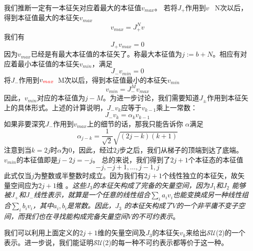 我们推断一定有一本征矢对应着最大的本征值{\sout{$v_{max}$}}。 若将$J_+$作用到$v$ \  N次以后，得到本征值最大的本征矢$v_{max}$
\begin{equation}\label{equ3.100}
  v_{max}=J_+^N v
\end{equation}
我们有
\begin{equation}\label{equ3.101}
  J_+v_{max}=0
\end{equation}
因为$v_{max}$已经是有最大本征值的本征矢了。称最大本征值为$j:=b+N$。相应有对应着最小本征值的本征矢$v_{min}$，满足
\begin{equation}\label{equ3.102}
  J_-v_{min}=0
\end{equation}
将$J_-$作用到$v_{\color{red}max}$\ M次以后，得到本征值最小的本征矢$v_{min}$
\begin{equation}\label{equ3.103}
  v_{min}=J_-^M v_{max}
\end{equation}
因此，$v_{min}$对应的本征值为$j-M$。为进一步讨论，我们需要知道$J_\pm$作用到本征矢上的具体形式。上述的计算说明，$J_- v_k$应等于$v_{k-1}$乘上一常数：
\begin{equation}\label{equ3.104}
  J_- v_k=\alpha_k v_{k-1}
\end{equation}
如果非要深究$J_-$作用到$v_{max}$上的细节的话，那我只能告诉你
 $\alpha$满足
\begin{equation}\label{equ3.105}
  \alpha_{j-k}=\frac{1}{\sqrt{2}}\sqrt{(2j-k)(k+1)}
\end{equation}
注意到当$k=2j$时$\alpha$为0，因此，经过$2j$步之后，我们从梯子的顶端到达了底端。$v_{min}$的本征值即是$j-2j=-j$。 总的来说，我们得到了$2j+1$个本征态的本征值
\begin{equation}\label{equ3.106}
  {-j,-j+1,\dots,j-1,j}
\end{equation}
此式仅当$j$为整数或半整数时成立。因为我们有$2j+1$个线性独立的本征矢，故矢量空间应为$2j+1$维
。{\it{这些$J_3$的本征矢构成了完备的矢量空间，因为$J_1$和$J_2$ 能够被$J_+$和$J_-$线性表示，就算是一个任意的线性组合$\sum_i a_i v_i$也能变换成另一种线性组合$\sum_i b_i v_i$，其中$a_i ,b_i$是常数。因此，$J_3$ 的本征矢构成了$V$的一个非平庸不变子空间，而我们也在寻找能构成完备矢量空间$V$的不可约表示}}。

我们可以利用上面定义的$2j+1$维的矢量空间及$J_3$的本征矢$v_k$来给出$\mathcal{SU}$(2)的一个表示。进一步说，我们能证明$\mathcal{SU}$(2)的每一种不可约表示都等价于这一种。

